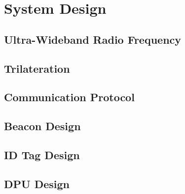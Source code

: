 

\setcounter{section}{2}
\section{System Design}
\bigskip


\subsection{Ultra-Wideband Radio Frequency}

\subsection{Trilateration}

\subsection{Communication Protocol}

\subsection{Beacon Design}

\subsection{ID Tag Design}

\subsection{DPU Design}